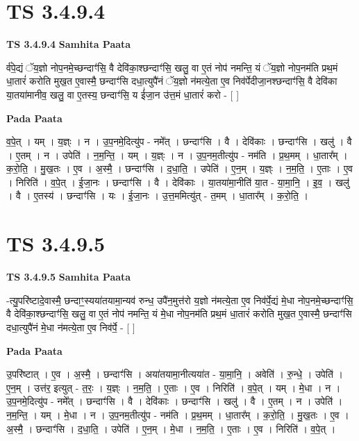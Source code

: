 \documentclass[17pt]{extarticle}
\begin{document}
\section{ TS 3.4.9.4 }

\textbf{TS 3.4.9.4 } \newline
\textbf{Samhita Paata} \newline

र्व॑पे॒द्यं ॅय॒ज्ञो नोप॒नमे॒च्छन्दाꣳ॑सि॒ वै देवि॑का॒श्छन्दाꣳ॑सि॒ खलु॒ वा ए॒तं नोप॑ नमन्ति॒ यं ॅय॒ज्ञो नोप॒नम॑ति प्रथ॒मं धा॒तारं॑ करोति मुख॒त ए॒वास्मै॒ छन्दाꣳ॑सि दधा॒त्युपै॑नं ॅय॒ज्ञो न॑मत्ये॒ता ए॒व निव॑र्पेदीजा॒नश्छन्दाꣳ॑सि॒ वै देवि॑का या॒तया॑मानीव॒ खलु॒ वा ए॒तस्य॒ छन्दाꣳ॑सि॒ य ई॑जा॒न उ॑त्त॒मं धा॒तारं॑ करो - [  ] \newline

\textbf{Pada Paata} \newline

व॒पे॒त् । यम् । य॒ज्ञ्ः । न । उ॒प॒नमे॒दित्यु॑प - नमे᳚त् । छन्दाꣳ॑सि । वै । देवि॑काः । छन्दाꣳ॑सि । खलु॑ । वै । ए॒तम् । न । उपेति॑ । न॒म॒न्ति॒ । यम् । य॒ज्ञ्ः । न । उ॒प॒नम॒तीत्यु॑प - नम॑ति । प्र॒थ॒मम् । धा॒तार᳚म् । क॒रो॒ति॒ । मु॒ख॒तः । ए॒व । अ॒स्मै॒ । छन्दाꣳ॑सि । द॒धा॒ति॒ । उपेति॑ । ए॒न॒म् । य॒ज्ञ्ः । न॒म॒ति॒ । ए॒ताः । ए॒व । निरिति॑ । व॒पे॒त् । ई॒जा॒नः । छन्दाꣳ॑सि । वै । देवि॑काः । या॒तया॑मा॒नीति॑ या॒त - या॒मा॒नि॒ । इ॒व॒ । खलु॑ । वै । ए॒तस्य॑ । छन्दाꣳ॑सि । यः । ई॒जा॒नः । उ॒त्त॒ममित्यु॑त् - त॒मम् । धा॒तार᳚म् । क॒रो॒ति॒ ।  \newline





\section{ TS 3.4.9.5 }

\textbf{TS 3.4.9.5 } \newline
\textbf{Samhita Paata} \newline

-त्यु॒परि॑ष्टादे॒वास्मै॒ छन्दाꣳ॒॒स्यया॑तयामा॒न्यव॑ रुन्ध॒ उपै॑न॒मुत्त॑रो य॒ज्ञो न॑मत्ये॒ता ए॒व निव॑र्पे॒द्यं मे॒धा नोप॒नमे॒च्छन्दाꣳ॑सि॒ वै देवि॑का॒श्छन्दाꣳ॑सि॒ खलु॒ वा ए॒तं नोप॑ नमन्ति॒ यं मे॒धा नोप॒नम॑ति प्रथ॒मं धा॒तारं॑ करोति मुख॒त ए॒वास्मै॒ छन्दाꣳ॑सि दधा॒त्युपै॑नं मे॒धा न॑मत्ये॒ता ए॒व निव॑र्पे॒ - [  ] \newline

\textbf{Pada Paata} \newline

उ॒परि॑ष्टात् । ए॒व । अ॒स्मै॒ । छन्दाꣳ॑सि । अया॑तयामा॒नीत्यया॑त - या॒मा॒नि॒ । अवेति॑ । रु॒न्धे॒ । उपेति॑ । ए॒न॒म् । उत्त॑र॒ इत्युत् - त॒रः॒ । य॒ज्ञ्ः । न॒म॒ति॒ । ए॒ताः । ए॒व । निरिति॑ । व॒पे॒त् । यम् । मे॒धा । न । उ॒प॒नमे॒दित्यु॑प - नमे᳚त् । छन्दाꣳ॑सि । वै । देवि॑काः । छन्दाꣳ॑सि । खलु॑ । वै । ए॒तम् । न । उपेति॑ । न॒म॒न्ति॒ । यम् । मे॒धा । न । उ॒प॒नम॒तीत्यु॑प - नम॑ति । प्र॒थ॒मम् । धा॒तार᳚म् । क॒रो॒ति॒ । मु॒ख॒तः । ए॒व । अ॒स्मै॒ । छन्दाꣳ॑सि । द॒धा॒ति॒ । उपेति॑ । ए॒न॒म् । मे॒धा । न॒म॒ति॒ । ए॒ताः । ए॒व । निरिति॑ । व॒पे॒त् ।  \newline
\end{document}
